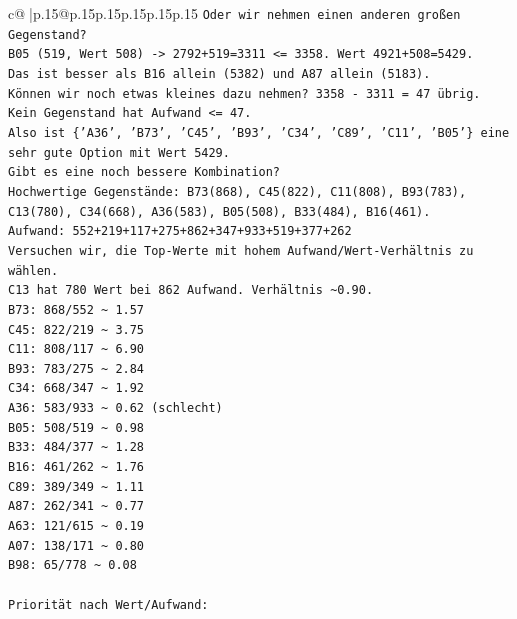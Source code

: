 \documentclass{article}
\begin{document}
{\begin{supertabular}{c@{$\;$}|p{.15\linewidth}@{}p{.15\linewidth}p{.15\linewidth}p{.15\linewidth}p{.15\linewidth}p{.15\linewidth}}
{{{\texttt{Oder wir nehmen einen anderen großen Gegenstand?} \\
\texttt{B05 (519, Wert 508) {-}> 2792+519=3311 <= 3358. Wert 4921+508=5429.} \\
\texttt{Das ist besser als B16 allein (5382) und A87 allein (5183).} \\
\texttt{Können wir noch etwas kleines dazu nehmen? 3358 {-} 3311 = 47 übrig. Kein Gegenstand hat Aufwand <= 47.} \\
\texttt{Also ist \{'A36', 'B73', 'C45', 'B93', 'C34', 'C89', 'C11', 'B05'\} eine sehr gute Option mit Wert 5429.} \\
\texttt{Gibt es eine noch bessere Kombination?} \\
\texttt{Hochwertige Gegenstände: B73(868), C45(822), C11(808), B93(783), C13(780), C34(668), A36(583), B05(508), B33(484), B16(461).} \\
\texttt{Aufwand: 552+219+117+275+862+347+933+519+377+262} \\
\texttt{Versuchen wir, die Top{-}Werte mit hohem Aufwand/Wert{-}Verhältnis zu wählen.} \\
\texttt{C13 hat 780 Wert bei 862 Aufwand. Verhältnis \textasciitilde{}0.90.} \\
\texttt{B73: 868/552 \textasciitilde{} 1.57} \\
\texttt{C45: 822/219 \textasciitilde{} 3.75} \\
\texttt{C11: 808/117 \textasciitilde{} 6.90} \\
\texttt{B93: 783/275 \textasciitilde{} 2.84} \\
\texttt{C34: 668/347 \textasciitilde{} 1.92} \\
\texttt{A36: 583/933 \textasciitilde{} 0.62 (schlecht)} \\
\texttt{B05: 508/519 \textasciitilde{} 0.98} \\
\texttt{B33: 484/377 \textasciitilde{} 1.28} \\
\texttt{B16: 461/262 \textasciitilde{} 1.76} \\
\texttt{C89: 389/349 \textasciitilde{} 1.11} \\
\texttt{A87: 262/341 \textasciitilde{} 0.77} \\
\texttt{A63: 121/615 \textasciitilde{} 0.19} \\
\texttt{A07: 138/171 \textasciitilde{} 0.80} \\
\texttt{B98: 65/778 \textasciitilde{} 0.08} \\
\\ 
\texttt{Priorität nach Wert/Aufwand:} \\
}}}
\end{supertabular}}
\end{document}
